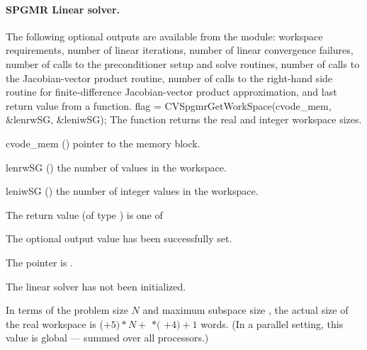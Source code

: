 %
%
\noindent\paragraph{\bf SPGMR Linear solver.}
The following optional outputs are available from the {\cvspgmr}
module: workspace requirements, number of linear iterations, number of
linear convergence failures, number of calls to the preconditioner
setup and solve routines, number of calls to the Jacobian-vector
product routine, number of calls to the right-hand side routine for
finite-difference Jacobian-vector product approximation, and last
return value from a {\cvspgmr} function.
{
  flag = CVSpgmrGetWorkSpace(cvode\_mem, \&lenrwSG, \&leniwSG);
}
{
  The function  returns the
  {\cvspgmr} real and integer workspace sizes.
}
{
  \begin{args}
  \item[cvode\_mem] ()
    pointer to the {\cvode} memory block.
  \item[lenrwSG] ()
    the number of  values in the {\cvspgmr} workspace.
  \item[leniwSG] ()
    the number of integer values in the {\cvspgmr} workspace.
  \end{args}
}
{
  The return value  (of type ) is one of
  \begin{args}
  \item[\Id{CVSPGMR\_SUCCESS}] 
    The optional output value has been successfully set.
  \item[\Id{CVSPGMR\_MEM\_NULL}]
    The  pointer is .
  \item[\Id{CVSPGMR\_LMEM\_NULL}]
    The {\cvspgmr} linear solver has not been initialized.
  \end{args}
}
{
  In terms of the problem size $N$ and maximum subspace size , 
  the actual size of the real workspace is
  ($+ 5)*N +$  $*($ $ + 4) + 1$ 
  words.  (In a parallel setting, this value is global --- summed over
  all processors.)
}
